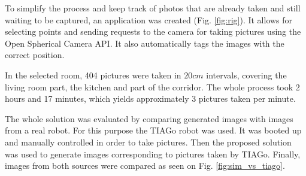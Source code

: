 \documentclass{svproc}
\begin{document}
To simplify the process and keep track of photos that are already taken and still waiting to 
be captured, an application was created (Fig. \ref{fig:rig}).
It allows for selecting points and sending requests to the camera for taking pictures using the
Open Spherical Camera API. It also automatically tags the images with the correct position.

In the selected room, 404 pictures were taken in $20 cm$ intervals, covering the living room part,
the kitchen and part of the corridor. The whole process took 2 hours and 17 minutes,
which yields approximately 3 pictures taken per minute. 


The whole solution was evaluated by comparing generated images with images from a real robot.
For this purpose the TIAGo robot was used.
It was booted up and manually controlled in order to take pictures.
Then the proposed solution was used to generate images corresponding to pictures taken by TIAGo.
Finally, images from both sources were compared as seen on Fig. \ref{fig:sim_vs_tiago}.
\end{document}
